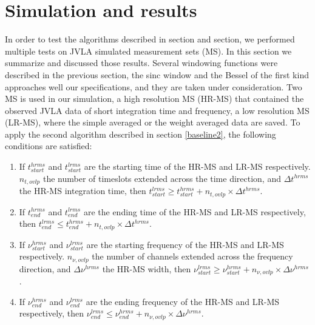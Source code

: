 \documentclass[useAMS,usenatbib]{mn2e}
\begin{document}
\section{Simulation and results}
In order to test the algorithms described in section and section, we performed  multiple tests on JVLA simulated measurement sets (MS). In 
this section we summarize and discussed those results. Several windowing functions  were described in the previous
section, the sinc window 
and the Bessel of the first kind approaches well our specifications, and they are taken under consideration. Two MS is used in 
our simulation, a high resolution MS (HR-MS) that contained the observed JVLA data of short integration time and frequency, a low resolution 
MS (LR-MS), where the simple averaged or the weight averaged data are saved. To apply the second algorithm described in section 
\ref{baseline2}, the following conditions are satisfied:
\begin{enumerate}
 \item If $t^{hrms}_{start}$ and $t^{lrms}_{start}$ are the starting time of the HR-MS and LR-MS respectively. $n_{t,ovlp}$ the number 
of timeslots extended across the time direction, and  $\Delta t^{hrms}$ the HR-MS integration time, then 
	    $t^{lrms}_{start}\geq t^{hrms}_{start} + n_{t,ovlp}\times \Delta t^{hrms}$. 
  \item If $t^{hrms}_{end}$ and $t^{lrms}_{end}$ are the ending time of the HR-MS and LR-MS respectively, then 
	    $t^{lrms}_{end}\leq t^{hrms}_{end} + n_{t,ovlp}\times \Delta t^{hrms}$. 
 \item If $\nu^{hrms}_{start}$ and $\nu^{lrms}_{start}$ are the starting frequency of the HR-MS and LR-MS respectively. $n_{\nu,ovlp}$ 
the number of channels extended across the frequency direction, and  $\Delta \nu^{hrms}$ the HR-MS width, then 
	    $\nu^{lrms}_{start} \geq \nu^{hrms}_{start} + n_{\nu,ovlp}\times \Delta \nu^{hrms}$. 
 \item If $\nu^{hrms}_{end}$ and $\nu^{lrms}_{end}$ are the ending frequency of the HR-MS and LR-MS respectively, then 
	    $\nu^{lrms}_{end} \leq \nu^{hrms}_{end} + n_{\nu,ovlp}\times \Delta \nu^{hrms}$. 
\end{enumerate}
\end{document}
